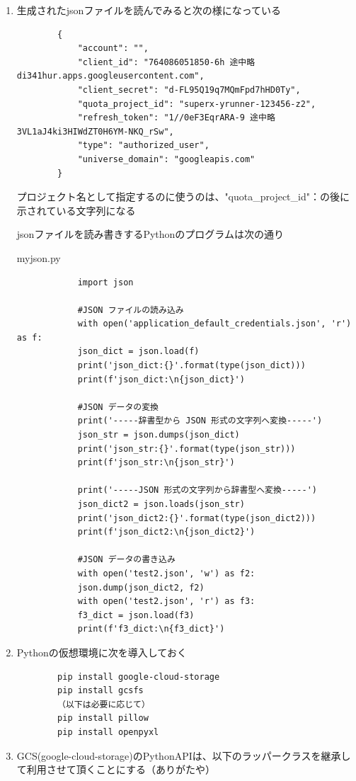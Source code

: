 \documentclass[12pt,a4j]{jsbook}
\begin{document}
\begin{enumerate}
	\item 生成されたjsonファイルを読んでみると次の様になっている
	\begin{verbatim}
		{
			"account": "",
			"client_id": "764086051850-6h 途中略 di341hur.apps.googleusercontent.com",
			"client_secret": "d-FL95Q19q7MQmFpd7hHD0Ty",
			"quota_project_id": "superx-yrunner-123456-z2",
			"refresh_token": "1//0eF3EqrARA-9 途中略 3VL1aJ4ki3HIWdZT0H6YM-NKQ_rSw",
			"type": "authorized_user",
			"universe_domain": "googleapis.com"
		}
	\end{verbatim}
	プロジェクト名として指定するのに使うのは、"quota\_project\_id"：の後に示されている文字列になる

	jsonファイルを読み書きするPythonのプログラムは次の通り
	\begin{spacing}{0.87}
	\begin{itembox}[l]{myjson.py}
		\begin{verbatim}
			import json

			#JSON ファイルの読み込み
			with open('application_default_credentials.json', 'r') as f:
			json_dict = json.load(f)
			print('json_dict:{}'.format(type(json_dict)))
			print(f'json_dict:\n{json_dict}')

			#JSON データの変換
			print('-----辞書型から JSON 形式の文字列へ変換-----')
			json_str = json.dumps(json_dict)
			print('json_str:{}'.format(type(json_str)))
			print(f'json_str:\n{json_str}')

			print('-----JSON 形式の文字列から辞書型へ変換-----')
			json_dict2 = json.loads(json_str)
			print('json_dict2:{}'.format(type(json_dict2)))
			print(f'json_dict2:\n{json_dict2}')

			#JSON データの書き込み
			with open('test2.json', 'w') as f2:
			json.dump(json_dict2, f2)
			with open('test2.json', 'r') as f3:
			f3_dict = json.load(f3)
			print(f'f3_dict:\n{f3_dict}')
		\end{verbatim}
	\end{itembox}
	\end{spacing}

	\item Pythonの仮想環境に次を導入しておく
	\begin{verbatim}
		pip install google-cloud-storage
		pip install gcsfs
		（以下は必要に応じて）
		pip install pillow
		pip install openpyxl
	\end{verbatim}

	\item GCS(google-cloud-storage)のPythonAPIは、以下のラッパークラス\footnotemark[7]を継承して利用させて頂くことにする（ありがたや）

	\setcounter{footnote}{7}

\end{enumerate}
\end{document}
